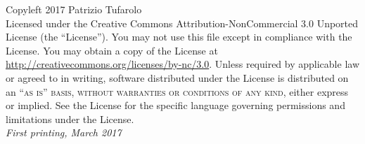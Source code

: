 \documentclass[11pt,fleqn]{book} %
\begin{document}
\noindent Copyleft 2017 Patrizio Tufarolo\\ %

\noindent Licensed under the Creative Commons Attribution-NonCommercial 3.0 Unported License (the ``License''). You may not use this file except in compliance with the License. You may obtain a copy of the License at \url{http://creativecommons.org/licenses/by-nc/3.0}. Unless required by applicable law or agreed to in writing, software distributed under the License is distributed on an \textsc{``as is'' basis, without warranties or conditions of any kind}, either express or implied. See the License for the specific language governing permissions and limitations under the License.\\ %

\noindent \textit{First printing, March 2017} %


\usechapterimagetrue
{} %

\pagestyle{empty} %

\tableofcontents %
\cleardoublepage %
\setcounter{page}{1}
\pagestyle{fancy} %

\usechapterimagefalse



\cleardoublepage
{}
\setlength{\columnsep}{0.75cm}
\printindex

\end{document}
